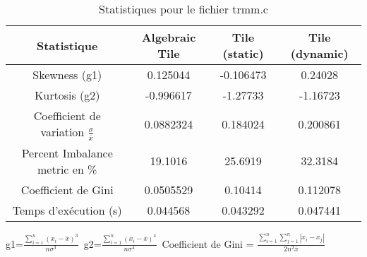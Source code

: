 \documentclass{article}
\begin{document}
\begin{table}[htbp]
  \centering
  \caption{Statistiques pour le fichier trmm.c}
  \begin{tabular}{|c|c|c|c|}
    \hline
    Statistique & Algebraic Tile & Tile (static) & Tile (dynamic) \\ 
    \hline
    Skewness (g1)  & 0.125044 & -0.106473 & 0.24028 \\ 
    Kurtosis (g2)  & -0.996617 & -1.27733 & -1.16723 \\ 
    Coefficient de variation $ \frac{\sigma}{\overline{x}} $ & 0.0882324 & 0.184024 & 0.200861\\ 
    Percent Imbalance metric en \% & 19.1016 & 25.6919 & 32.3184\\ 
    Coefficient de Gini  & 0.0505529 & 0.10414 & 0.112078\\ 
    Temps d'exécution (s) &  0.044568    &  0.043292   &  0.047441   \\ 

    \hline
  \end{tabular}
\end{table}
g1=$ \frac{\sum_{i=1}^{n} (x_i - \overline{x})^3}{n\sigma^3} $\
g2=$ \frac{\sum_{i=1}^{n} (x_i - \overline{x})^4}{n\sigma^4} $\
Coefficient de Gini = $ \frac{\sum_{i=1}^{n}\sum_{j=1}^{n} |x_i - x_j|}{2n^2\overline{x}} $\
\newpage
\end{document}
